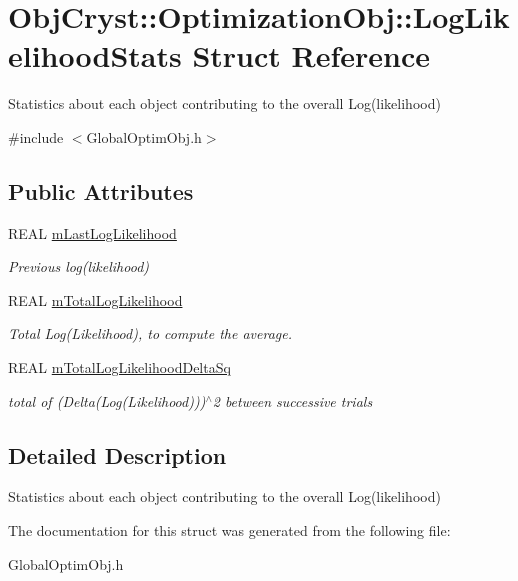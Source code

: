 \hypertarget{struct_obj_cryst_1_1_optimization_obj_1_1_log_likelihood_stats}{}\section{Obj\+Cryst\+::Optimization\+Obj\+::Log\+Likelihood\+Stats Struct Reference}
\label{struct_obj_cryst_1_1_optimization_obj_1_1_log_likelihood_stats}


Statistics about each object contributing to the overall Log(likelihood)  




{\ttfamily \#include $<$Global\+Optim\+Obj.\+h$>$}

\subsection*{Public Attributes}
\begin{DoxyCompactItemize}
\item 
\mbox{\label{struct_obj_cryst_1_1_optimization_obj_1_1_log_likelihood_stats_ab7ca39bcc656b2c92cfde1dedc33b7d0}} 
R\+E\+AL \mbox{\hyperlink{struct_obj_cryst_1_1_optimization_obj_1_1_log_likelihood_stats_ab7ca39bcc656b2c92cfde1dedc33b7d0}{m\+Last\+Log\+Likelihood}}
\begin{DoxyCompactList}\small\item\em Previous log(likelihood) \end{DoxyCompactList}\item 
\mbox{\label{struct_obj_cryst_1_1_optimization_obj_1_1_log_likelihood_stats_a2bcf5607d7bf66fc816cc8e550eef463}} 
R\+E\+AL \mbox{\hyperlink{struct_obj_cryst_1_1_optimization_obj_1_1_log_likelihood_stats_a2bcf5607d7bf66fc816cc8e550eef463}{m\+Total\+Log\+Likelihood}}
\begin{DoxyCompactList}\small\item\em Total Log(\+Likelihood), to compute the average. \end{DoxyCompactList}\item 
\mbox{\label{struct_obj_cryst_1_1_optimization_obj_1_1_log_likelihood_stats_a0b6e826d8f5e0e5a99abc1d52caa6876}} 
R\+E\+AL \mbox{\hyperlink{struct_obj_cryst_1_1_optimization_obj_1_1_log_likelihood_stats_a0b6e826d8f5e0e5a99abc1d52caa6876}{m\+Total\+Log\+Likelihood\+Delta\+Sq}}
\begin{DoxyCompactList}\small\item\em total of (Delta(\+Log(\+Likelihood)))$^\wedge$2 between successive trials \end{DoxyCompactList}\end{DoxyCompactItemize}


\subsection{Detailed Description}
Statistics about each object contributing to the overall Log(likelihood) 

The documentation for this struct was generated from the following file\+:\begin{DoxyCompactItemize}
\item 
Global\+Optim\+Obj.\+h\end{DoxyCompactItemize}
